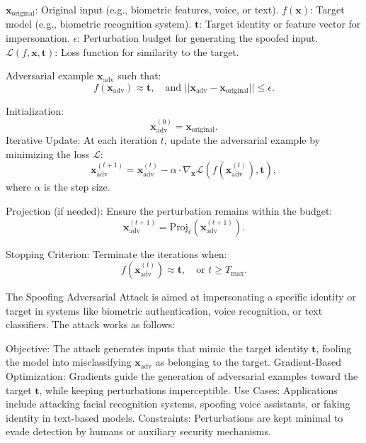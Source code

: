 $\mathbf{x}_{\text{original}}$: Original input (e.g., biometric features, voice, or text).
$f(\mathbf{x})$: Target model (e.g., biometric recognition system).
$\mathbf{t}$: Target identity or feature vector for impersonation.
$\epsilon$: Perturbation budget for generating the spoofed input.
$\mathcal{L}(f, \mathbf{x}, \mathbf{t})$: Loss function for similarity to the target.

Adversarial example $\mathbf{x}_{\text{adv}}$ such that:
\[
f(\mathbf{x}_{\text{adv}}) \approx \mathbf{t}, \quad \text{and } ||\mathbf{x}_{\text{adv}} - \mathbf{x}_{\text{original}}|| \leq \epsilon.
\]

Initialization:
    \[
    \mathbf{x}_{\text{adv}}^{(0)} = \mathbf{x}_{\text{original}}.
    \]
Iterative Update:
    At each iteration $t$, update the adversarial example by minimizing the loss $\mathcal{L}$:
    \[
    \mathbf{x}_{\text{adv}}^{(t+1)} = \mathbf{x}_{\text{adv}}^{(t)} - \alpha \cdot \nabla_{\mathbf{x}} \mathcal{L}(f(\mathbf{x}_{\text{adv}}^{(t)}), \mathbf{t}),
    \]
    where $\alpha$ is the step size.

Projection (if needed):
    Ensure the perturbation remains within the budget:
    \[
    \mathbf{x}_{\text{adv}}^{(t+1)} = \text{Proj}_\epsilon(\mathbf{x}_{\text{adv}}^{(t+1)}).
    \]

Stopping Criterion:
    Terminate the iterations when:
    \[
    f(\mathbf{x}_{\text{adv}}^{(t)}) \approx \mathbf{t}, \quad \text{or } t \geq T_{\text{max}}.
    \]

The Spoofing Adversarial Attack is aimed at impersonating a specific identity or target in systems like biometric authentication, voice recognition, or text classifiers. The attack works as follows:

Objective: The attack generates inputs that mimic the target identity $\mathbf{t}$, fooling the model into misclassifying $\mathbf{x}_{\text{adv}}$ as belonging to the target.
Gradient-Based Optimization: Gradients guide the generation of adversarial examples toward the target $\mathbf{t}$, while keeping perturbations imperceptible.
Use Cases: Applications include attacking facial recognition systems, spoofing voice assistants, or faking identity in text-based models.
Constraints: Perturbations are kept minimal to evade detection by humans or auxiliary security mechanisms.